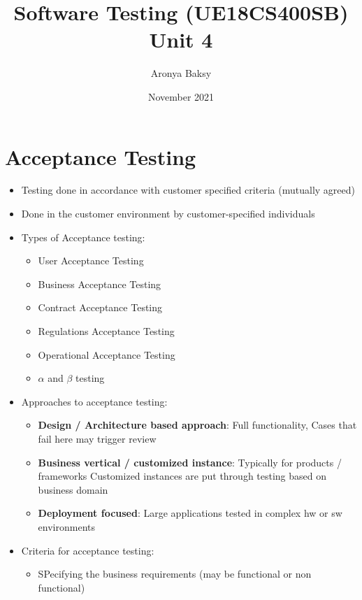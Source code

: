 \documentclass{article}
\title{Software Testing (UE18CS400SB) \\ Unit 4}
\author{Aronya Baksy}
\date{November 2021}
\begin{document}
\maketitle
\section{Acceptance Testing}
\begin{itemize}
    \item Testing done in accordance with customer specified criteria (mutually agreed)
    
    \item Done in the customer environment by customer-specified individuals
    
    \item Types of Acceptance testing:
    \begin{itemize}
        \item User Acceptance Testing
        
        \item Business Acceptance Testing
        
        \item Contract Acceptance Testing
        
        \item Regulations Acceptance Testing
        
        \item Operational Acceptance Testing
        
        \item $\alpha$ and $\beta$ testing
    \end{itemize}
    
    \item Approaches to acceptance testing:
    \begin{itemize}
        \item \textbf{Design / Architecture based approach}: Full functionality, Cases that fail here may trigger review

        \item \textbf{Business vertical / customized instance}:
Typically for products / frameworks
Customized instances are put through testing based on business domain

        \item \textbf{ Deployment focused}: Large applications tested in complex hw or sw environments
    \end{itemize}
    
    \item Criteria for acceptance testing:
    \begin{itemize}
        \item SPecifying the business requirements (may be functional or non functional)
        

\end{itemize}
\end{itemize}
\end{document}
